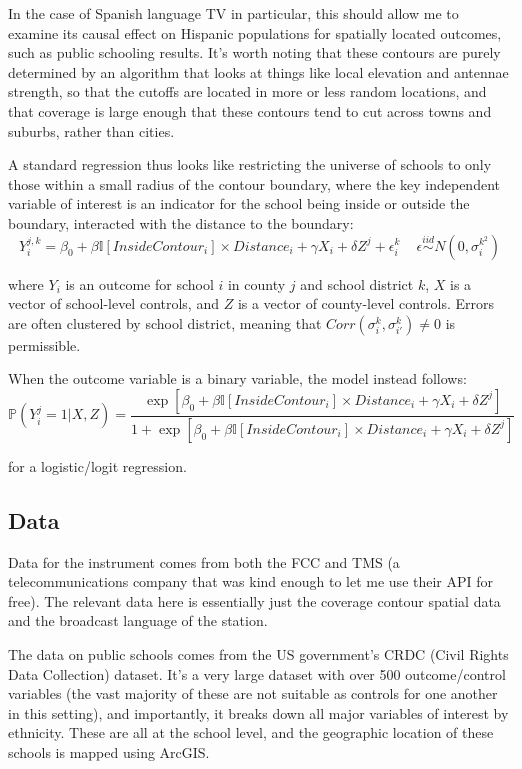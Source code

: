 \documentclass{article}
\begin{document}
In the case of Spanish language TV in particular, this should allow me to examine its causal effect on Hispanic populations for spatially located outcomes, such as public schooling results. It's worth noting that these contours are purely determined by an algorithm that looks at things like local elevation and antennae strength, so that the cutoffs are located in more or less random locations, and that coverage is large enough that these contours tend to cut across towns and suburbs, rather than cities. %

A standard regression thus looks like restricting the universe of schools to only those within a small radius of the contour boundary, where the key independent variable of interest is an indicator for the school being inside or outside the boundary, interacted with the distance to the boundary:
\[ Y_i^{j,k} = \beta_0 + \beta \mathbb{I}[InsideContour_i] \times Distance_i + \gamma X_i + \delta Z^j + \epsilon_i^k \, \, \, \, \, \, \, \epsilon \stackrel{iid}{\sim}   N(0,\sigma_i^{k^2})\]

where $Y_i$ is an outcome for school $i$ in county $j$ and school district $k$, $X$ is a vector of school-level controls, and $Z$ is a vector of county-level controls. Errors are often clustered by school district, meaning that $Corr(\sigma_i^k, \sigma_{i'}^k) \neq 0$ is permissible.

When the outcome variable is a binary variable, the model instead follows:
\[\mathbb{P}(Y_i^j = 1 | X,Z) = \frac{\exp[\beta_0 + \beta \mathbb{I}[InsideContour_i] \times Distance_i + \gamma X_i + \delta Z^j ] }{ 1 + \exp[\beta_0 + \beta \mathbb{I}[InsideContour_i] \times Distance_i + \gamma X_i + \delta Z^j ]}\]

for a logistic/logit regression. 

\subsection*{Data}

Data for the instrument comes from both the FCC and TMS (a telecommunications company that was kind enough to let me use their API for free). The relevant data here is essentially just the coverage contour spatial data and the broadcast language of the station.


The data on public schools comes from the US government's CRDC (Civil Rights Data Collection) dataset. It's a very large dataset with over 500 outcome/control variables (the vast majority of these are not suitable as controls for one another in this setting), and importantly, it breaks down all major variables of interest by ethnicity. These are all at the school level, and the geographic location of these schools is mapped using ArcGIS. 
\end{document}
